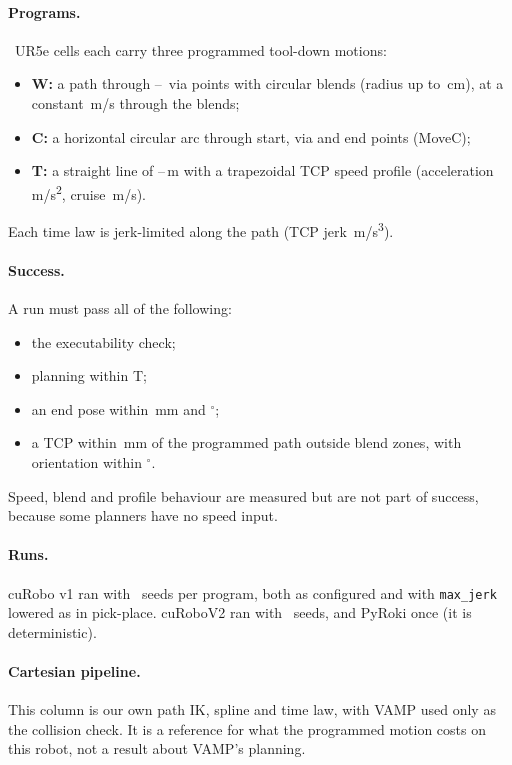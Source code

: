 \documentclass[11pt]{article}
\begin{document}
\paragraph{Programs.} \ttCells\ UR5e cells each carry three programmed tool-down motions:
\begin{itemize}
  \item \textbf{W:} a path through \ttViasMin--\ttViasMax\ via points with circular blends (radius up to \ttBlendR\,cm), at a constant \ttV\,m/s through the blends;
  \item \textbf{C:} a horizontal circular arc through start, via and end points (MoveC);
  \item \textbf{T:} a straight line of \ttTLenMin--\ttTLenMax\,m with a trapezoidal TCP speed profile (acceleration \ttTA\,m/s\textsuperscript{2}, cruise \ttV\,m/s).
\end{itemize}
Each time law is jerk-limited along the path (TCP jerk \ttTcpJerk\,m/s\textsuperscript{3}).

\paragraph{Success.} A run must pass all of the following:
\begin{itemize}
  \item the executability check;
  \item planning within T;
  \item an end pose within \ttEndMm\,mm and \ttEndDeg$^\circ$;
  \item a TCP within \ttPathLimit\,mm of the programmed path outside blend zones, with orientation within \ttEndDeg$^\circ$.
\end{itemize}
Speed, blend and profile behaviour are measured but are not part of success, because some planners have no speed input.

\paragraph{Runs.} cuRobo v1 ran with \ttSeedsVOne\ seeds per program, both as configured and with \texttt{max\_jerk} lowered as in pick-place. cuRoboV2 ran with \ttSeedsVTwo\ seeds, and PyRoki once (it is deterministic).

\paragraph{Cartesian pipeline.} This column is our own path IK, spline and time law, with VAMP used only as the collision check. It is a reference for what the programmed motion costs on this robot, not a result about VAMP's planning.
\end{document}
